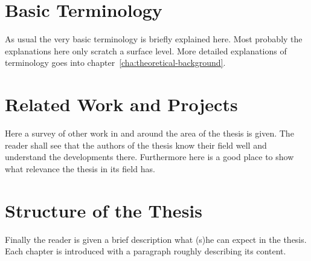 \section{Basic Terminology}
As usual the very basic terminology is briefly explained here. Most probably the explanations here only scratch a surface level. More detailed explanations of terminology goes into chapter~\ref{cha:theoretical-background}.

\section{Related Work and Projects}
Here a survey of other work in and around the area of the thesis is given. The reader shall see that the authors of the thesis know their field well and understand the developments there. Furthermore here is a good place to show what relevance the thesis in its field has.

\section{Structure of the Thesis}
Finally the reader is given a brief description what (s)he can expect in the thesis. Each chapter is introduced with a paragraph roughly describing its content.